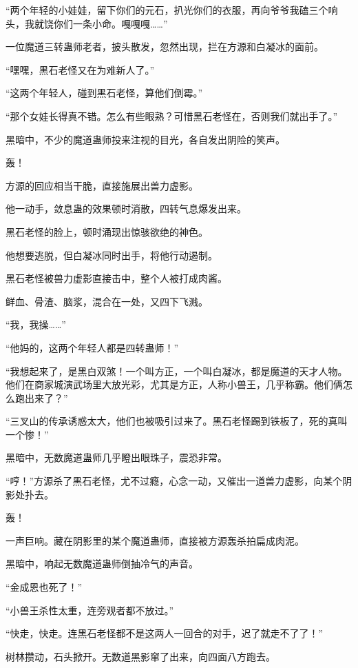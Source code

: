 
\begin{this_body}

“两个年轻的小娃娃，留下你们的元石，扒光你们的衣服，再向爷爷我磕三个响头，我就饶你们一条小命。嘎嘎嘎……”

一位魔道三转蛊师老者，披头散发，忽然出现，拦在方源和白凝冰的面前。

“嘿嘿，黑石老怪又在为难新人了。”

“这两个年轻人，碰到黑石老怪，算他们倒霉。”

“那个女娃长得真不错。怎么有些眼熟？可惜黑石老怪在，否则我们就出手了。”

黑暗中，不少的魔道蛊师投来注视的目光，各自发出阴险的笑声。

轰！

方源的回应相当干脆，直接施展出兽力虚影。

他一动手，敛息蛊的效果顿时消散，四转气息爆发出来。

黑石老怪的脸上，顿时涌现出惊骇欲绝的神色。

他想要逃脱，但白凝冰同时出手，将他行动遏制。

黑石老怪被兽力虚影直接击中，整个人被打成肉酱。

鲜血、骨渣、脑浆，混合在一处，又四下飞溅。

“我，我操……”

“他妈的，这两个年轻人都是四转蛊师！”

“我想起来了，是黑白双煞！一个叫方正，一个叫白凝冰，都是魔道的天才人物。他们在商家城演武场里大放光彩，尤其是方正，人称小兽王，几乎称霸。他们俩怎么跑出来了？”

“三叉山的传承诱惑太大，他们也被吸引过来了。黑石老怪踢到铁板了，死的真叫一个惨！”

黑暗中，无数魔道蛊师几乎瞪出眼珠子，震恐非常。

“哼！”方源杀了黑石老怪，尤不过瘾，心念一动，又催出一道兽力虚影，向某个阴影处扑去。

轰！

一声巨响。藏在阴影里的某个魔道蛊师，直接被方源轰杀拍扁成肉泥。

黑暗中，响起无数魔道蛊师倒抽冷气的声音。

“金成恩也死了！”

“小兽王杀性太重，连旁观者都不放过。”

“快走，快走。连黑石老怪都不是这两人一回合的对手，迟了就走不了了！”

树林攒动，石头掀开。无数道黑影窜了出来，向四面八方跑去。


\end{this_body}
